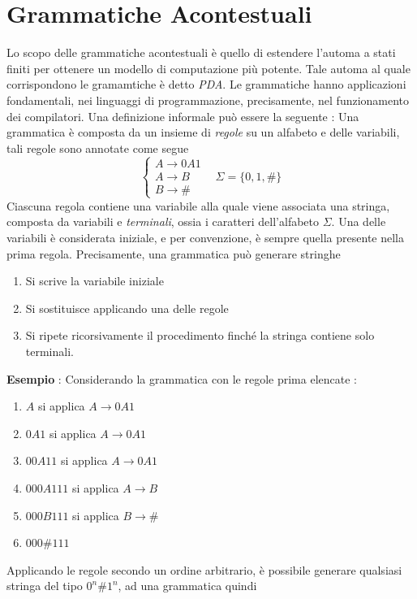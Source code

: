 \documentclass[10pt, letterpaper]{report}
\begin{document}
 \section{Grammatiche Acontestuali}
 Lo scopo delle grammatiche acontestuali è quello di estendere  
 l'automa a stati finiti per ottenere un modello di computazione più 
 potente. Tale automa al quale corrispondono le gramamtiche è 
 detto \textit{PDA}. Le grammatiche hanno applicazioni fondamentali, 
 nei linguaggi di programmazione, precisamente, nel funzionamento 
 dei compilatori.\acc 
 Una definizione informale può essere la seguente : Una grammatica è 
composta da un insieme di \textit{regole} su un alfabeto e delle variabili, tali 
regole sono annotate come segue $$\begin{cases}
    A\longrightarrow 0A1\\ 
    A \longrightarrow B \\
    B \longrightarrow \#
\end{cases}\ \ \ \ \Sigma = \{0,1,\#\} $$
Ciascuna regola contiene una variabile alla quale viene associata una stringa, 
composta da variabili e \textit{terminali}, ossia i caratteri dell'alfabeto $\Sigma$.
Una delle variabili è considerata iniziale, e per convenzione, è sempre quella 
presente nella prima regola.\acc 
Precisamente, una grammatica può generare stringhe\begin{enumerate}
    \item Si scrive la variabile iniziale 
    \item Si sostituisce applicando una delle regole 
    \item Si ripete ricorsivamente il procedimento finché la stringa contiene 
    solo terminali.
\end{enumerate}
\textbf{Esempio} : Considerando la grammatica con le regole prima elencate :\begin{enumerate}
    \item $A$ si applica $A\longrightarrow 0A1$
    \item $0A1$ si applica $A\longrightarrow 0A1$ 
    \item $00A11$ si applica $A\longrightarrow 0A1$ 
    \item $000A111$ si applica $A\longrightarrow B$
    \item $000B111$ si applica $B\longrightarrow \#$
    \item $000\#111$
\end{enumerate}
Applicando le regole secondo un ordine arbitrario, è possibile 
generare qualsiasi stringa del tipo $0^n\#1^n$, ad una grammatica quindi 
\end{document}
